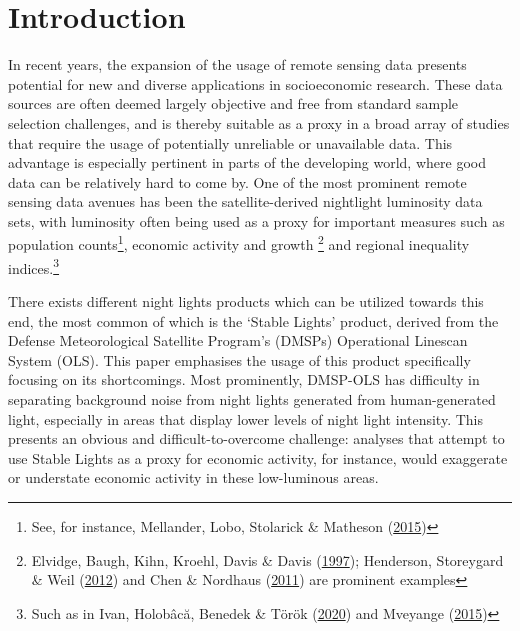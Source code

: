 \documentclass[11pt,preprint, authoryear]{elsarticle}
\numberwithin{equation}{section}
\numberwithin{figure}{section}
\numberwithin{table}{section}
\let\rmarkdownfootnote\footnote%
\def\footnote{\protect\rmarkdownfootnote}
\begin{document}

\headsep 35pt %




\hypertarget{introduction}{%
\section{\texorpdfstring{Introduction
\label{Introduction}}{Introduction }}\label{introduction}}

In recent years, the expansion of the usage of remote sensing data
presents potential for new and diverse applications in socioeconomic
research. These data sources are often deemed largely objective and free
from standard sample selection challenges, and is thereby suitable as a
proxy in a broad array of studies that require the usage of potentially
unreliable or unavailable data. This advantage is especially pertinent
in parts of the developing world, where good data can be relatively hard
to come by. One of the most prominent remote sensing data avenues has
been the satellite-derived nightlight luminosity data sets, with
luminosity often being used as a proxy for important measures such as
population counts\footnote{See, for instance, Mellander, Lobo, Stolarick
  \& Matheson (\protect\hyperlink{ref-mellander2015night}{2015})},
economic activity and growth \footnote{Elvidge, Baugh, Kihn, Kroehl,
  Davis \& Davis (\protect\hyperlink{ref-elvidge1997}{1997}); Henderson,
  Storeygard \& Weil (\protect\hyperlink{ref-henderson2012}{2012}) and
  Chen \& Nordhaus (\protect\hyperlink{ref-chen2011}{2011}) are
  prominent examples} and regional inequality indices.\footnote{Such as
  in Ivan, Holobâcă, Benedek \& Török
  (\protect\hyperlink{ref-ivan2020nlinequality}{2020}) and Mveyange
  (\protect\hyperlink{ref-mveyange2015}{2015})}

There exists different night lights products which can be utilized
towards this end, the most common of which is the `Stable Lights'
product, derived from the Defense Meteorological Satellite Program's
(DMSPs) Operational Linescan System (OLS). This paper emphasises the
usage of this product specifically focusing on its shortcomings. Most
prominently, DMSP-OLS has difficulty in separating background noise from
night lights generated from human-generated light, especially in areas
that display lower levels of night light intensity. This presents an
obvious and difficult-to-overcome challenge: analyses that attempt to
use Stable Lights as a proxy for economic activity, for instance, would
exaggerate or understate economic activity in these low-luminous areas.
\end{document}
